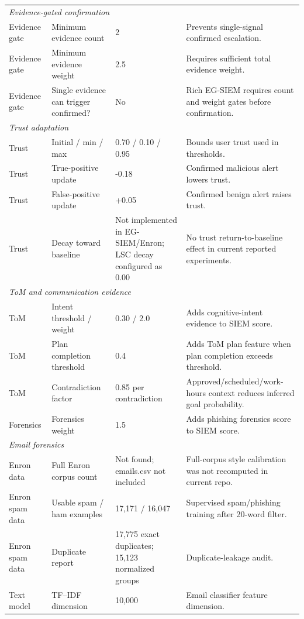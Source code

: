 \begin{table}[t]
\begin{tabular}{llll}
\midrule
\multicolumn{4}{l}{\textit{Evidence-gated confirmation}} \\
Evidence gate & Minimum evidence count & 2 & Prevents single-signal confirmed escalation. \\
Evidence gate & Minimum evidence weight & 2.5 & Requires sufficient total evidence weight. \\
Evidence gate & Single evidence can trigger confirmed? & No & Rich EG-SIEM requires count and weight gates before confirmation. \\
\midrule
\multicolumn{4}{l}{\textit{Trust adaptation}} \\
Trust & Initial / min / max & 0.70 / 0.10 / 0.95 & Bounds user trust used in thresholds. \\
Trust & True-positive update & -0.18 & Confirmed malicious alert lowers trust. \\
Trust & False-positive update & +0.05 & Confirmed benign alert raises trust. \\
Trust & Decay toward baseline & Not implemented in EG-SIEM/Enron; LSC decay configured as 0.00 & No trust return-to-baseline effect in current reported experiments. \\
\midrule
\multicolumn{4}{l}{\textit{ToM and communication evidence}} \\
ToM & Intent threshold / weight & 0.30 / 2.0 & Adds cognitive-intent evidence to SIEM score. \\
ToM & Plan completion threshold & 0.4 & Adds ToM plan feature when plan completion exceeds threshold. \\
ToM & Contradiction factor & 0.85 per contradiction & Approved/scheduled/work-hours context reduces inferred goal probability. \\
Forensics & Forensics weight & 1.5 & Adds phishing forensics score to SIEM score. \\
\midrule
\multicolumn{4}{l}{\textit{Email forensics}} \\
Enron data & Full Enron corpus count & Not found; emails.csv not included & Full-corpus style calibration was not recomputed in current repo. \\
Enron spam data & Usable spam / ham examples & 17,171 / 16,047 & Supervised spam/phishing training after 20-word filter. \\
Enron spam data & Duplicate report & 17,775 exact duplicates; 15,123 normalized groups & Duplicate-leakage audit. \\
Text model & TF--IDF dimension & 10,000 & Email classifier feature dimension. \\

\end{tabular}
\end{table}

